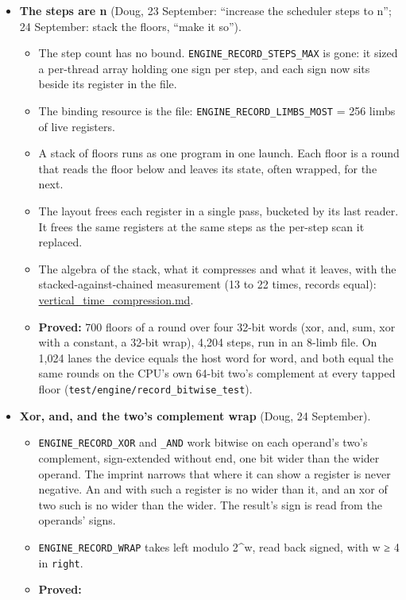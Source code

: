\begin{itemize}
\item \textbf{The steps are n} (Doug, 23 September: “increase the scheduler steps to n”; 24 September: stack the floors, “make it so”).

\begin{itemize}
\item The step count has no bound. \texttt{ENGINE\_\allowbreak{}RECORD\_\allowbreak{}STEPS\_\allowbreak{}MAX} is gone: it sized a per-thread array holding one sign per step, and each sign now sits beside its register in the file.
\item The binding resource is the file: \texttt{ENGINE\_\allowbreak{}RECORD\_\allowbreak{}LIMBS\_\allowbreak{}MOST} = 256 limbs of live registers.
\item A stack of floors runs as one program in one launch. Each floor is a round that reads the floor below and leaves its state, often wrapped, for the next.
\item The layout frees each register in a single pass, bucketed by its last reader. It frees the same registers at the same steps as the per-step scan it replaced.
\item The algebra of the stack, what it compresses and what it leaves, with the stacked-against-chained measurement (13 to 22 times, records equal): \hyperref[chap:vertical-time-compression]{vertical\_\allowbreak{}time\_\allowbreak{}compression.md}.
\item \textbf{Proved:} 700 floors of a round over four 32-bit words (xor, and, sum, xor with a constant, a 32-bit wrap), 4,204 steps, run in an 8-limb file. On 1,024 lanes the device equals the host word for word, and both equal the same rounds on the CPU's own 64-bit two's complement at every tapped floor (\texttt{test/\allowbreak{}engine/\allowbreak{}record\_\allowbreak{}bitwise\_\allowbreak{}test}).
\end{itemize}
\item \textbf{Xor, and, and the two's complement wrap} (Doug, 24 September).

\begin{itemize}
\item \texttt{ENGINE\_\allowbreak{}RECORD\_\allowbreak{}XOR} and \texttt{\_\allowbreak{}AND} work bitwise on each operand's two's complement, sign-extended without end, one bit wider than the wider operand. The imprint narrows that where it can show a register is never negative. An and with such a register is no wider than it, and an xor of two such is no wider than the wider. The result's sign is read from the operands' signs.
\item \texttt{ENGINE\_\allowbreak{}RECORD\_\allowbreak{}WRAP} takes left modulo 2\textasciicircum{}w, read back signed, with w ≥ 4 in \texttt{right}.
\item \textbf{Proved:}


\end{itemize}
\end{itemize}
